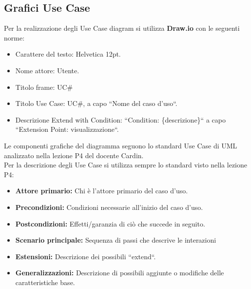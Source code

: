 \subsection{Grafici Use Case}
Per la realizzazione degli Use Case diagram si utilizza \textbf{Draw.io} con le seguenti norme:
\begin{itemize}
\item Carattere del testo: Helvetica 12pt.
\item Nome attore: Utente.
\item Titolo frame: UC\#
\item Titolo Use Case: UC\#, a capo ``Nome del caso d'uso``.
\item Descrizione Extend with Condition: ``Condition: \{descrizione\}`` a capo ``Extension Point: visualizzazione``.
\end{itemize}
Le componenti grafiche del diagramma seguono lo standard Use Case di UML analizzato nella lezione P4 del docente Cardin. \\

\noindent Per la descrizione degli Use Case si utilizza sempre lo standard visto nella lezione P4:
\begin{itemize}
	\item \textbf{Attore primario:} Chi è l'attore primario del caso d'uso.
	\item \textbf{Precondizioni:} Condizioni necessarie all'inizio del caso d'uso.
	\item \textbf{Postcondizioni:} Effetti/garanzia di ciò che succede in seguito.
	\item \textbf{Scenario principale:} Sequenza di passi che descrive le interazioni
	\item \textbf{Estensioni:} Descrizione dei possibili ``extend``.
	\item \textbf{Generalizzazioni:} Descrizione di possibili aggiunte o modifiche delle caratteristiche base.
\end{itemize}


